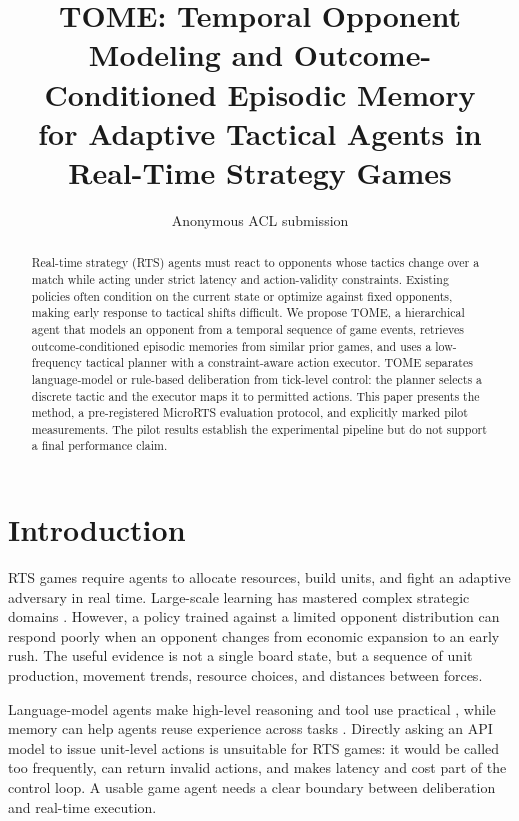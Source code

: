 \documentclass[11pt]{article}
\title{TOME: Temporal Opponent Modeling and Outcome-Conditioned Episodic Memory\\
for Adaptive Tactical Agents in Real-Time Strategy Games}
\author{Anonymous ACL submission}
\begin{document}
\maketitle

\begin{abstract}
Real-time strategy (RTS) agents must react to opponents whose tactics change over
a match while acting under strict latency and action-validity constraints.
Existing policies often condition on the current state or optimize against fixed
opponents, making early response to tactical shifts difficult. We propose TOME,
a hierarchical agent that models an opponent from a temporal sequence of game
events, retrieves outcome-conditioned episodic memories from similar prior
games, and uses a low-frequency tactical planner with a constraint-aware action
executor. TOME separates language-model or rule-based deliberation from
tick-level control: the planner selects a discrete tactic and the executor maps
it to permitted actions. This paper presents the method, a pre-registered
MicroRTS evaluation protocol, and explicitly marked pilot measurements. The
pilot results establish the experimental pipeline but do not support a final
performance claim.
\end{abstract}

\section{Introduction}

RTS games require agents to allocate resources, build units, and fight an
adaptive adversary in real time. Large-scale learning has mastered complex
strategic domains \citep{vinyals2019grandmaster,berner2019dota}. However, a
policy trained against a limited opponent distribution can respond poorly when
an opponent changes from economic expansion to an early rush. The useful
evidence is not a single board state, but a sequence of unit production,
movement trends, resource choices, and distances between forces.

Language-model agents make high-level reasoning and tool use practical
\citep{yao2023react,wang2023voyager}, while memory can help agents reuse
experience across tasks \citep{park2023generative,shinn2023reflexion}. Directly
asking an API model to issue unit-level actions is unsuitable for RTS games: it
would be called too frequently, can return invalid actions, and makes latency
and cost part of the control loop. A usable game agent needs a clear boundary
between deliberation and real-time execution.
\end{document}
